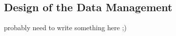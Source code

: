 \subsection{Design of the Data Management}
\label{subsec:designdatamanagement}

probably need to write something here ;)